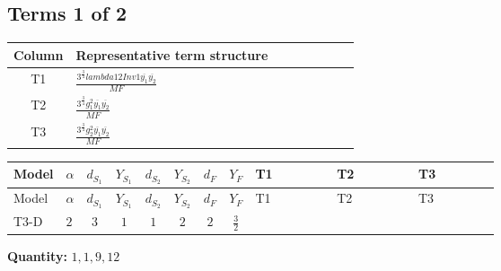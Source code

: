 \documentclass[8pt]{article}
\begin{document}
\begin{landscape}
\subsection*{Terms 1 of 2}
\begin{center}
\begin{tabular}{@{}c >{\raggedright\arraybackslash}p{0.82\linewidth}@{}}
\toprule
Column & Representative term structure \\
\midrule
T1 & \(\displaystyle \frac{3^{\frac{3}{4}} lambda12Inv1 \overline{y_{1}} \overline{y_{2}}}{MF}\) \\
\midrule
T2 & \(\displaystyle \frac{3^{\frac{3}{4}} g_{1}^{2} \overline{y_{1}} \overline{y_{2}}}{MF}\) \\
\midrule
T3 & \(\displaystyle \frac{3^{\frac{3}{4}} g_{2}^{2} \overline{y_{1}} \overline{y_{2}}}{MF}\) \\
\midrule
\bottomrule
\end{tabular}
\end{center}
\smallskip
\tiny
\begin{longtable}{@{}llcccccc >{\raggedright\arraybackslash}p{0.21\linewidth} >{\raggedright\arraybackslash}p{0.21\linewidth} >{\raggedright\arraybackslash}p{0.21\linewidth}@{}}
\toprule
Model & $\alpha$ & $d_{S_1}$ & $Y_{S_1}$ & $d_{S_2}$ & $Y_{S_2}$ & $d_F$ & $Y_F$ & T1 & T2 & T3 \\
\midrule
\endfirsthead
\toprule
Model & $\alpha$ & $d_{S_1}$ & $Y_{S_1}$ & $d_{S_2}$ & $Y_{S_2}$ & $d_F$ & $Y_F$ & T1 & T2 & T3 \\
\midrule
\endhead
T3-D & $2$ & $3$ & $1$ & $1$ & $2$ & $2$ & $\frac{3}{2}$ & \scriptsize\adjustbox{max width=\linewidth}{$\begin{gathered} \frac{3^{\frac{3}{4}} lambda12Inv1 \overline{y_{1}} \overline{y_{2}}}{6 MF}\end{gathered}$} & \scriptsize\adjustbox{max width=\linewidth}{$\begin{gathered} \frac{9 \cdot 3^{\frac{3}{4}} g_{1}^{2} \overline{y_{1}} \overline{y_{2}}}{8 MF}\end{gathered}$} & \scriptsize\adjustbox{max width=\linewidth}{$\begin{gathered} \frac{11 \cdot 3^{\frac{3}{4}} g_{2}^{2} \overline{y_{1}} \overline{y_{2}}}{8 MF}\end{gathered}$} \\
\midrule
\bottomrule
\end{longtable}
\clearpage
\noindent\textbf{Quantity: }$\mathrm{1,1,9,12}$\par\smallskip

\end{landscape}
\end{document}
